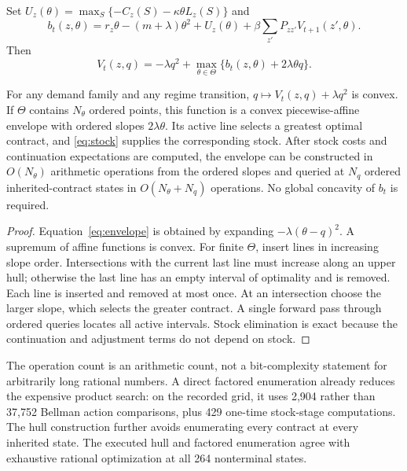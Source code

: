 Set $U_z(\theta)=\max_S\{-C_z(S)-\kappa\theta L_z(S)\}$ and
\begin{equation}\label{eq:b}
 b_t(z,\theta)=r_z\theta-(m+\lambda)\theta^2+U_z(\theta)
                 +\beta\sum_{z'}P_{zz'}V_{t+1}(z',\theta).
\end{equation}
Then
\begin{equation}\label{eq:envelope}
 V_t(z,q)=-\lambda q^2+\max_{\theta\in\Theta}\{b_t(z,\theta)+2\lambda\theta q\}.
\end{equation}
\begin{theorem}\label{thm:envelope}
For any demand family and any regime transition, $q\mapsto V_t(z,q)+\lambda q^2$ is convex. If $\Theta$ contains $N_\theta$ ordered points, this function is a convex piecewise-affine envelope with ordered slopes $2\lambda\theta$. Its active line selects a greatest optimal contract, and \eqref{eq:stock} supplies the corresponding stock. After stock costs and continuation expectations are computed, the envelope can be constructed in $O(N_\theta)$ arithmetic operations from the ordered slopes and queried at $N_q$ ordered inherited-contract states in $O(N_\theta+N_q)$ operations. No global concavity of $b_t$ is required.
\end{theorem}
\begin{proof}
Equation~\eqref{eq:envelope} is obtained by expanding $-\lambda(\theta-q)^2$. A supremum of affine functions is convex. For finite $\Theta$, insert lines in increasing slope order. Intersections with the current last line must increase along an upper hull; otherwise the last line has an empty interval of optimality and is removed. Each line is inserted and removed at most once. At an intersection choose the larger slope, which selects the greater contract. A single forward pass through ordered queries locates all active intervals. Stock elimination is exact because the continuation and adjustment terms do not depend on stock.\end{proof}

The operation count is an arithmetic count, not a bit-complexity statement for arbitrarily long rational numbers. A direct factored enumeration already reduces the expensive product search: on the recorded grid, it uses 2,904 rather than 37,752 Bellman action comparisons, plus 429 one-time stock-stage computations. The hull construction further avoids enumerating every contract at every inherited state. The executed hull and factored enumeration agree with exhaustive rational optimization at all 264 nonterminal states.

